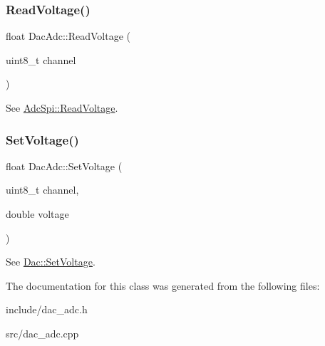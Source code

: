 \subsubsection{\texorpdfstring{Read\+Voltage()}{ReadVoltage()}}
{\footnotesize\ttfamily float Dac\+Adc\+::\+Read\+Voltage (\begin{DoxyParamCaption}\item[{uint8\+\_\+t}]{channel }\end{DoxyParamCaption})}

See \mbox{\hyperlink{classAdcSpi_ace8264acfedb357986afa5f611eff3ee}{Adc\+Spi\+::\+Read\+Voltage}}. \mbox{\label{classDacAdc_a2c307a0ecebbdc35e8f365d80eb8a40a}} 
\subsubsection{\texorpdfstring{Set\+Voltage()}{SetVoltage()}}
{\footnotesize\ttfamily float Dac\+Adc\+::\+Set\+Voltage (\begin{DoxyParamCaption}\item[{uint8\+\_\+t}]{channel,  }\item[{double}]{voltage }\end{DoxyParamCaption})}

See \mbox{\hyperlink{classDac_ab2f0e36184b9b529de04136c36a3a51b}{Dac\+::\+Set\+Voltage}}. 

The documentation for this class was generated from the following files\+:\begin{DoxyCompactItemize}
\item 
include/dac\+\_\+adc.\+h\item 
src/dac\+\_\+adc.\+cpp\end{DoxyCompactItemize}
